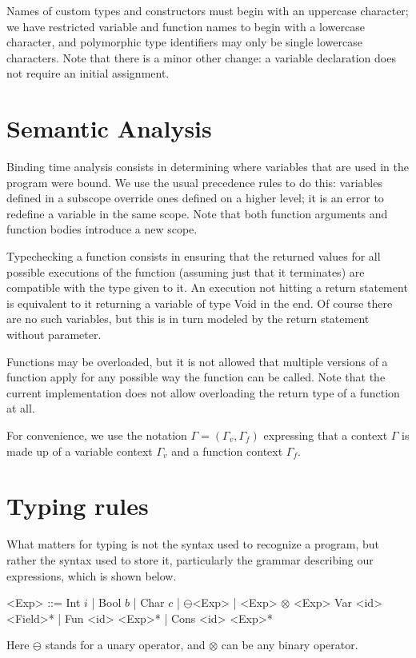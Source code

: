 \documentclass[a4paper]{article}
\begin{document}
Names of custom types and constructors must begin with an uppercase character; we have restricted variable and function names to begin with a lowercase character, and polymorphic type identifiers may only be single lowercase characters.
Note that there is a minor other change: a variable declaration does not require an initial assignment.

\section{Semantic Analysis}

Binding time analysis consists in determining where variables that are used in the program were bound.
We use the usual precedence rules to do this: variables defined in a subscope override ones defined on a higher level; it is an error to redefine a variable in the same scope.
Note that both function arguments and function bodies introduce a new scope.

Typechecking a function consists in ensuring that the returned values for all possible executions of the function (assuming just that it terminates) are compatible with the type given to it.
An execution not hitting a return statement is equivalent to it returning a variable of type Void in the end.
Of course there are no such variables, but this is in turn modeled by the return statement without parameter.

Functions may be overloaded, but it is not allowed that multiple versions of a function apply for any possible way the function can be called.
Note that the current implementation does not allow overloading the return type of a function at all.

For convenience, we use the notation $\Gamma = (\Gamma_v, \Gamma_f)$ expressing that a context $\Gamma$ is made up of a variable context $\Gamma_v$ and a function context $\Gamma_f$.

\section{Typing rules}

What matters for typing is not the syntax used to recognize a program, but rather the syntax used to store it, particularly the grammar describing our expressions, which is shown below.
\setlength{\grammarindent}{4.1em}
\begin{grammar}
    <Exp> ::= Int $i$ | Bool $b$ | Char $c$ | $\ominus$<Exp> | <Exp> $\otimes$ <Exp>
    \alt Var <id> <Field>* | Fun <id> <Exp>* | Cons <id> <Exp>*
\end{grammar}
Here $\ominus$ stands for a unary operator, and $\otimes$ can be any binary operator.
\end{document}
